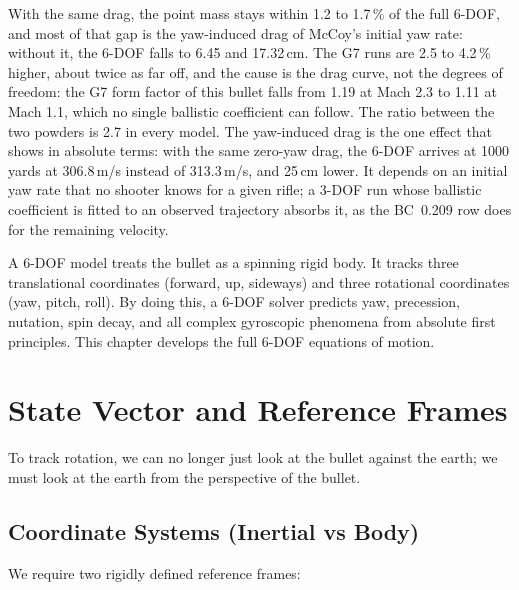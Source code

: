 \documentclass[11pt,twoside,openright]{report}
\begin{document}
With the same drag, the point mass stays within 1.2 to 1.7\,\% of the full 6-DOF, and most of that gap is the yaw-induced drag of McCoy's initial yaw rate: without it, the 6-DOF falls to 6.45 and 17.32\,cm. The G7 runs are 2.5 to 4.2\,\% higher, about twice as far off, and the cause is the drag curve, not the degrees of freedom: the G7 form factor of this bullet falls from 1.19 at Mach 2.3 to 1.11 at Mach 1.1, which no single ballistic coefficient can follow. The ratio between the two powders is 2.7 in every model. The yaw-induced drag is the one effect that shows in absolute terms: with the same zero-yaw drag, the 6-DOF arrives at 1000 yards at 306.8\,m/s instead of 313.3\,m/s, and 25\,cm lower. It depends on an initial yaw rate that no shooter knows for a given rifle; a 3-DOF run whose ballistic coefficient is fitted to an observed trajectory absorbs it, as the BC~0.209 row does for the remaining velocity.

A 6-DOF model treats the bullet as a spinning rigid body. It tracks three translational coordinates (forward, up, sideways) and three rotational coordinates (yaw, pitch, roll). By doing this, a 6-DOF solver predicts yaw, precession, nutation, spin decay, and all complex gyroscopic phenomena from absolute first principles. This chapter develops the full 6-DOF equations of motion.

\section{State Vector and Reference Frames}

To track rotation, we can no longer just look at the bullet against the earth; we must look at the earth from the perspective of the bullet.

\subsection{Coordinate Systems (Inertial vs Body)}

We require two rigidly defined reference frames:
\end{document}
